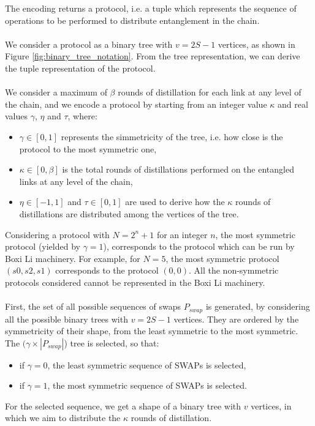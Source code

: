\documentclass{article}
\begin{document}
The encoding returns a protocol, i.e. a tuple which represents the sequence of operations to be performed to distribute entanglement in the chain.
\\\\
We consider a protocol as a binary tree with $v = 2S - 1$ vertices, as shown in Figure \ref{fig:binary_tree_notation}. From the tree representation, we can derive the tuple representation of the protocol.
\\\\
We consider a maximum of $\beta$ rounds of distillation for each link at any level of the chain, and we encode a protocol by starting from an integer value $\kappa$ and real values $\gamma$, $\eta$ and $\tau$, where:
\begin{itemize}
    \item $\gamma \in [0,1]$ represents the simmetricity of the tree, i.e. how close is the protocol to the most symmetric one,
    \item $\kappa \in [0, \beta]$ is the total rounds of distillations performed on the entangled links at any level of the chain,
    \item $\eta \in [-1, 1]$ and $\tau \in [0,1]$ are used to derive how the $\kappa$ rounds of distillations are distributed among the vertices of the tree.  
\end{itemize}
Considering a protocol with $N=2^n+1$ for an integer $n$, the most symmetric protocol (yielded by \(\gamma=1\)), corresponds to the protocol which can be run by Boxi Li machinery.
For example, for $N=5$, the most symmetric protocol $(s0, s2, s1)$ corresponds to the protocol $(0,0)$.
All the non-symmetric protocols considered cannot be represented in the Boxi Li machinery.
\\\\
First, the set of all possible sequences of swaps $P_{swap}$ is generated, by considering all the possible binary trees with $v = 2S - 1$ vertices. 
They are ordered by the symmetricity of their shape, from the least symmetric to the most symmetric. 
The \((\gamma \times |P_{swap}|\)) tree is selected, so that:
\begin{itemize}
    \item if \(\gamma = 0\), the least symmetric sequence of SWAPs is selected,
    \item if \(\gamma = 1\), the most symmetric sequence of SWAPs is selected.
\end{itemize}
For the selected sequence, we get a shape of a binary tree with $v$ vertices, in which we aim to distribute the $\kappa$ rounds of distillation.
\end{document}
